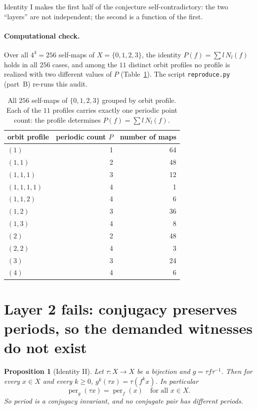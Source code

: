 \documentclass[11pt]{article}
\newtheorem{proposition}{Proposition}
\theoremstyle{definition}
\begin{document}
Identity I makes the first half of the conjecture self-contradictory: the two
``layers'' are not independent; the second is a function of the first.

\paragraph{Computational check.}
Over all $4^4=256$ self-maps of $X=\{0,1,2,3\}$, the identity
$P(f)=\sum l\,N_l(f)$ holds in all $256$ cases, and among the $11$ distinct
orbit profiles no profile is realized with two different values of $P$
(Table~\ref{tab:selfmaps}). The script \texttt{reproduce.py} (part~B) re-runs
this audit.

\begin{table}[ht]
\centering
\begin{tabular}{lrr}
\toprule
orbit profile & periodic count $P$ & number of maps\\
\midrule
$(1)$          & 1 & 64\\
$(1,1)$        & 2 & 48\\
$(1,1,1)$      & 3 & 12\\
$(1,1,1,1)$    & 4 & 1\\
$(1,1,2)$      & 4 & 6\\
$(1,2)$        & 3 & 36\\
$(1,3)$        & 4 & 8\\
$(2)$          & 2 & 48\\
$(2,2)$        & 4 & 3\\
$(3)$          & 3 & 24\\
$(4)$          & 4 & 6\\
\bottomrule
\end{tabular}
\caption{All $256$ self-maps of $\{0,1,2,3\}$ grouped by orbit profile. Each of
the $11$ profiles carries exactly one periodic point count: the profile
determines $P(f)=\sum l\,N_l(f)$.}
\label{tab:selfmaps}
\end{table}

\section{Layer 2 fails: conjugacy preserves periods, so the demanded witnesses do not exist}

\begin{proposition}[Identity II]\label{prop:II}
Let $\tau\colon X\to X$ be a bijection and $g=\tau f\tau^{-1}$. Then for every
$x\in X$ and every $k\ge0$,
$g^k(\tau x)=\tau(f^kx)$. In particular
\begin{equation}
\operatorname{per}_g(\tau x)=\operatorname{per}_f(x)\quad\text{for all }x\in X.
\end{equation}
So period is a conjugacy invariant, and no conjugate pair has different periods.
\end{proposition}
\end{document}
